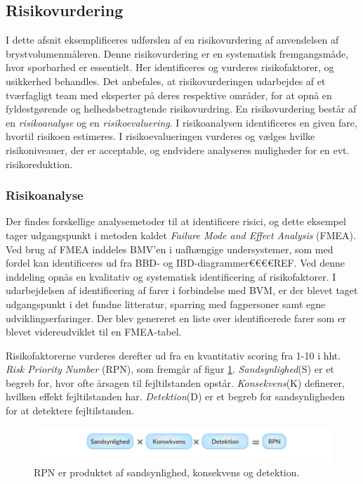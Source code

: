 \subsection{Risikovurdering}
I dette afsnit eksemplificeres udførslen af en risikovurdering af anvendelsen af brystvolumenmåleren. Denne risikovurdering er en systematisk fremgangsmåde, hvor sporbarhed er essentielt. Her identificeres og vurderes risikofaktorer, og usikkerhed behandles. 
Det anbefales, at risikovurderingen udarbejdes af et tværfagligt team med eksperter på deres respektive områder, for at opnå en fyldestgørende og helhedsbetragtende risikovurdring.   
En risikovurdering består af en \textit{risikoanalyse} og en \textit{risikoevaluering}. I risikoanalysen identificeres en given fare, hvortil risikoen estimeres. I risikoevalueringen vurderes og vælges hvilke risikoniveauer, der er acceptable, og endvidere analyseres muligheder for en evt. risikoreduktion.

	\subsubsection{Risikoanalyse}
	Der findes forskellige analysemetoder til at identificere risici, og dette eksempel tager udgangspunkt i metoden kaldet \textit{Failure Mode and Effect Analysis}{} (FMEA). Ved brug af FMEA inddeles BMV'en i uafhængige undersystemer, som med fordel kan identificeres ud fra BBD- og IBD-diagrammer€€€€REF. Ved denne inddeling opnås en kvalitativ og systematisk identificering af risikofaktorer.
	I udarbejdelsen af identificering af farer i forbindelse med BVM, er der blevet taget udgangspunkt i det fundne litteratur, sparring med fagpersoner samt egne udviklingserfaringer. Der blev genereret en liste over identificerede farer som er blevet videreudviklet til en FMEA-tabel.  
	
	Risikofaktorerne vurderes derefter ud fra en kvantitativ scoring fra 1-10 i hht. \textit{Risk Priority Number}{} (RPN), som fremgår af figur \ref{fig:rpn}. \textit{Sandsynlighed}{}(S) er et begreb for, hvor ofte årsagen til fejltilstanden opstår. \textit{Konsekvens}{}(K) definerer, hvilken effekt fejltilstanden har. \textit{Detektion}{}(D) er et begreb for sandsynligheden for at detektere fejltilstanden. 	
	 
	\begin{figure}[htb]
	\centering
	\includegraphics[width=5in]{RPN}
	\caption	{RPN er produktet af sandsynlighed, konsekvens og detektion.}
	\label{fig:rpn}
	\end{figure}

